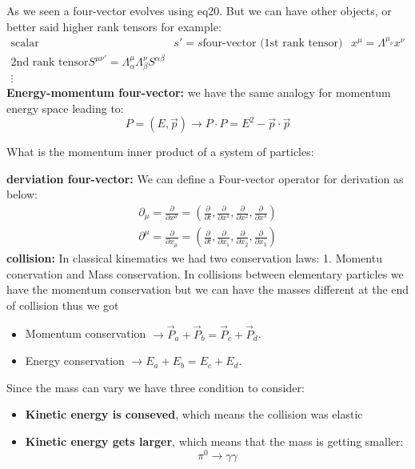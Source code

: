 \documentclass[10pt,a4paper]{article}
\begin{document}
          As we seen a four-vector evolves using eq20. But we can have other objects, or better said higher rank tensors for example:
          \begin{equation}
               \begin{matrix}
                    \text{scalar} & s' = s
                    \text{four-vector (1st rank tensor)} & x^\mu = \Lambda^{\mu_\nu} x^{\nu}\\
                    \text{2nd rank tensor} S^{\mu\nu'} = \Lambda^\mu_\alpha \Lambda^\nu_\beta S^{\alpha\beta}\\
                    \vdots
               \end{matrix}
          \end{equation}
          \textbf{Energy-momentum four-vector:} we have the same analogy for momentum energy space leading to:
          \begin{equation}
               P=(E,\vec p)\rightarrow P\cdot P = E^2 - \vec p\cdot\vec p
          \end{equation}   
          \begin{ecx}
               What is the momentum inner product of a system of particles:
          \end{ecx}
          \textbf{derviation four-vector:} We can define a Four-vector operator for derivation as below:
          \begin{align}
               \partial_\mu = \frac{\partial}{\partial x^\mu} = \left(\frac{\partial}{\partial t} ,\frac{\partial}{\partial x^1},\frac{\partial}{\partial x^2},\frac{\partial}{\partial x^3}\right)\\
               \partial^\mu = \frac{\partial}{\partial x_\mu} = \left(\frac{\partial}{\partial t} ,\frac{\partial}{\partial x_1},\frac{\partial}{\partial x_2},\frac{\partial}{\partial x_3}\right)
          \end{align}
          \textbf{collision:} In classical kinematics we had two conservation laws: 1. Momentu conervation and Mass conservation. In collisions between elementary particles we have the momentum conservation but we can have the masses different at the end of collision thus we got 
          \begin{itemize}
               \item Momentum conservation $\rightarrow \vec P_a +\vec P_b = \vec P_c + \vec P_d$.
               \item Energy conservation   $\rightarrow E_a +E_b = E_c+E_d$.
          \end{itemize}
          Since the mass can vary we have three condition to consider:
          \begin{itemize}
               \item \textbf{Kinetic energy is conseved}, which means the collision was elastic
               \item \textbf{Kinetic energy gets larger}, which means that the mass is getting smaller:
               $$
                \pi^0 \rightarrow \gamma\gamma
               $$
          \end{itemize}
\end{document}
